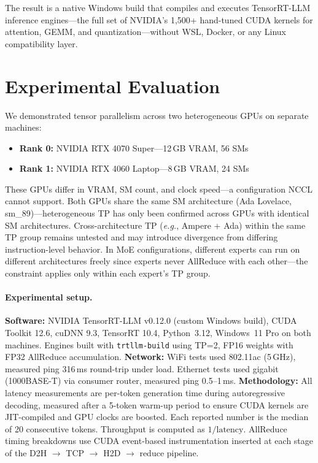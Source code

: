 \documentclass[10pt,twocolumn]{article}
\newcommand{\eg}{\emph{e.g.}}
\begin{document}
The result is a native Windows build that compiles and executes
TensorRT-LLM inference engines---the full set of NVIDIA's 1,500+
hand-tuned CUDA kernels for attention, GEMM, and quantization---without
WSL, Docker, or any Linux compatibility layer.

\section{Experimental Evaluation}\label{sec:eval}

We demonstrated tensor parallelism across two heterogeneous GPUs on
separate machines:

\begin{itemize}[nosep,leftmargin=*]
  \item \textbf{Rank 0:} NVIDIA RTX 4070 Super---12\,GB VRAM, 56 SMs
  \item \textbf{Rank 1:} NVIDIA RTX 4060 Laptop---8\,GB VRAM, 24 SMs
\end{itemize}

These GPUs differ in VRAM, SM count, and clock speed---a configuration
NCCL cannot support.  Both GPUs share the same SM architecture (Ada
Lovelace, sm\_89)---heterogeneous TP has only been confirmed across GPUs
with identical SM architectures.  Cross-architecture TP (\eg, Ampere +
Ada) within the same TP group remains untested and may introduce divergence
from differing instruction-level behavior.  In MoE configurations,
different experts can run on different architectures freely since experts
never AllReduce with each other---the constraint applies only within each
expert's TP group.

\paragraph{Experimental setup.}
\textbf{Software:} NVIDIA TensorRT-LLM v0.12.0 (custom Windows build),
CUDA Toolkit 12.6, cuDNN 9.3, TensorRT 10.4, Python~3.12, Windows~11 Pro
on both machines.  Engines built with \texttt{trtllm-build} using TP=2,
FP16 weights with FP32 AllReduce accumulation.
\textbf{Network:} WiFi tests used 802.11ac (5\,GHz), measured ping
316\,ms round-trip under load.  Ethernet tests used gigabit (1000BASE-T)
via consumer router, measured ping 0.5--1\,ms.
\textbf{Methodology:} All latency measurements are per-token generation
time during autoregressive decoding, measured after a 5-token warm-up
period to ensure CUDA kernels are JIT-compiled and GPU clocks are boosted.
Each reported number is the median of 20 consecutive tokens.  Throughput is
computed as $1/\text{latency}$.  AllReduce timing breakdowns use CUDA
event-based instrumentation inserted at each stage of the D2H $\to$ TCP
$\to$ H2D $\to$ reduce pipeline.
\end{document}
